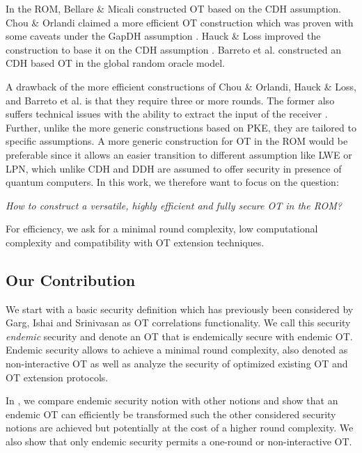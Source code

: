 In the ROM, Bellare \& Micali \cite{C:BelMic89} constructed OT based on the CDH assumption. Chou \& Orlandi \cite{LC:ChoOrl15} claimed a more efficient OT construction which was proven with some caveats under the GapDH assumption \cite{cryptoeprint:2017:1011}. Hauck \& Loss improved the construction to base it on the CDH assumption \cite{cryptoeprint:2017:1011}. Barreto et al. \cite{EPRINT:BDDMN17b} constructed an CDH based OT in the global random oracle model.  

A drawback of the more efficient constructions of Chou \& Orlandi, Hauck \& Loss, and Barreto et al. is that they require three or more rounds. The former also suffers technical issues with the ability to extract the input of the receiver \cite{LC:ChoOrl15}. Further, unlike the more generic constructions based on PKE, they are tailored to specific assumptions. A more generic construction for OT in the ROM would be preferable since it allows an easier transition to different assumption like LWE or LPN, which unlike CDH and DDH are assumed to offer security in presence of quantum computers. In this work, we therefore want to focus on the question:

\begin{center}
\emph{How to construct a versatile, highly efficient and fully secure OT in the ROM?}
\end{center}

For efficiency, we ask for a minimal round complexity, low computational complexity and compatibility with OT extension techniques.

\subsection{Our Contribution}

We start with a basic security definition which has previously been considered by Garg, Ishai and Srinivasan \cite{TCC:GarIshSri18} as OT correlations functionality. We call this security \emph{endemic} security and denote an OT that is endemically secure with endemic OT. Endemic security allows to achieve a minimal round complexity, also denoted as non-interactive OT \cite{C:BelMic89,TCC:GarIshSri18} as well as analyze the security of optimized existing OT and OT extension protocols.

In , we compare endemic security notion with other notions and show that an endemic OT can efficiently  be transformed such the other considered security notions are achieved but potentially at the cost of a higher round complexity. We also show that  only endemic security permits a one-round or non-interactive OT.

